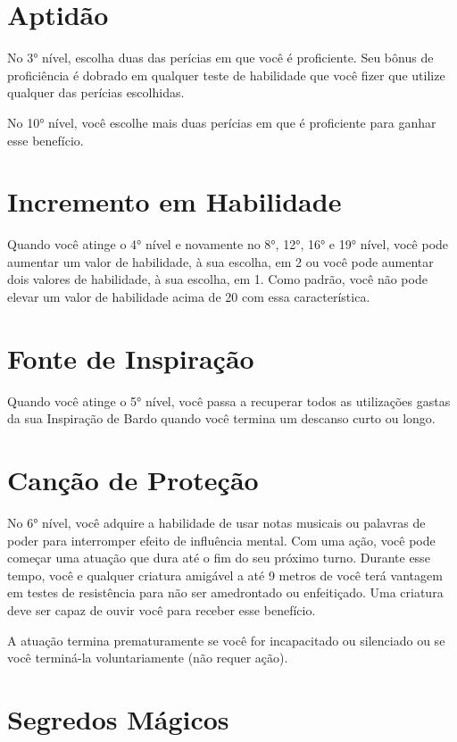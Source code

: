 \documentclass{RPG_Adventure}[2021/10/20]
\begin{document}
\begin{multicols}{2}
\section*{Aptidão}%

No 3° nível, escolha duas das perícias em que você é proficiente. Seu bônus de
proficiência é dobrado em qualquer teste de habilidade que você fizer que
utilize qualquer das perícias escolhidas.

No 10° nível, você escolhe mais duas perícias em que é proficiente para ganhar
esse benefício.

\section*{Incremento em Habilidade}%

Quando você atinge o 4° nível e novamente no 8°, 12°, 16° e 19° nível, você pode
aumentar um valor de habilidade, à sua escolha, em 2 ou você pode aumentar dois
valores de habilidade, à sua escolha, em 1. Como padrão, você não pode elevar um
valor de habilidade acima de 20 com essa característica.

\section*{Fonte de Inspiração}%

Quando você atinge o 5° nível, você passa a recuperar todos as utilizações
gastas da sua Inspiração de Bardo quando você termina um descanso curto ou
longo.

\section*{Canção de Proteção}%

No 6° nível, você adquire a habilidade de usar notas musicais ou palavras de
poder para interromper efeito de influência mental. Com uma ação, você pode
começar uma atuação que dura até o fim do seu próximo turno. Durante esse tempo,
você e qualquer criatura amigável a até 9 metros de você terá vantagem em testes
de resistência para não ser amedrontado ou enfeitiçado. Uma criatura deve ser
capaz de ouvir você para receber esse benefício.

A atuação termina prematuramente se você for incapacitado ou silenciado ou se
você terminá-la voluntariamente (não requer ação).

\section*{Segredos Mágicos}%


\end{multicols}
\end{document}
